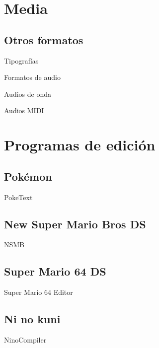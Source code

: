 \section{Media}
\subsection{Otros formatos}
\begin{frame}{Tipografías}
\end{frame}

\begin{frame}{Formatos de audio}
\end{frame}

\begin{frame}{Audios de onda}
\end{frame}

\begin{frame}{Audios MIDI}
\end{frame}

\section{Programas de edición}
\subsection{Pokémon}
\begin{frame}{PokeText}
\end{frame}

\subsection{New Super Mario Bros DS}
\begin{frame}{NSMB}
\end{frame}

\subsection{Super Mario 64 DS}
\begin{frame}{Super Mario 64 Editor}
\end{frame}

\subsection{Ni no kuni}
\begin{frame}{NinoCompiler}
\end{frame}
